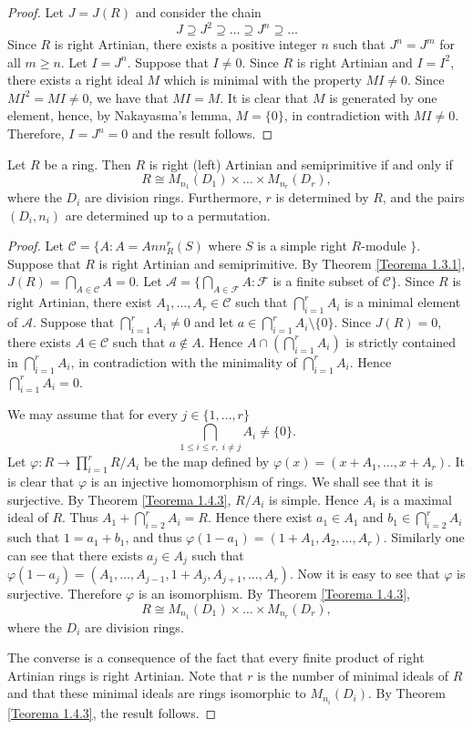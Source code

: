 \begin{proof}
Let $J=J(R)$ and consider the chain
$$J\supseteq J^2\supseteq\dots\supseteq J^n\supseteq\dots$$
Since $R$ is right Artinian, there exists a positive integer $n$
such that $J^n=J^m$ for all $m\geq n$. Let $I=J^n$. Suppose that
$I\neq 0$. Since $R$ is right Artinian and $I=I^2$, there exists a right ideal $M$ which is minimal with the property
$MI\neq 0$. Since $MI^2=MI\neq 0$,
we have that $MI=M$. It is clear that $M$ is generated by one element, hence, by Nakayasma's lemma, $M=\{0\}$, in contradiction with $MI\neq 0$. Therefore,
$I=J^n=0$ and the result follows.
\end{proof}

\begin{theorem}
Let $R$ be a ring. Then $R$ is right (left) Artinian and semiprimitive if and only if
$$R\cong M_{n_1}(D_1)\times \dots\times M_{n_r}(D_r),$$
where the $D_i$ are division rings. Furthermore, $r$ is determined by $R$, and the pairs $(D_i,n_i)$ are determined up to a permutation.
\end{theorem}

\begin{proof}
Let $\mathcal{C}=\{ A : A=Ann^r_R(S)$ where $S$ is a simple right $R$-module $\}$. Suppose that $R$ is right Artinian and semiprimitive.
By Theorem \ref{Teorema 1.3.1}, $J(R)=\bigcap_{A\in\mathcal{C}}A=0$. Let $\mathcal{A}=\{\bigcap_{A\in \mathcal{F}}A  : \mathcal{F}$ is a finite subset of $\mathcal{C}\}$. Since $R$ is right Artinian, there exist $A_1,\dots,A_r\in \mathcal{C}$ such that
$\bigcap_{i=1}^rA_i$ is a minimal element of $\mathcal{A}$. Suppose that
$\bigcap_{i=1}^rA_i\neq 0$ and let $a\in\bigcap_{i=1}^rA_i\setminus\{ 0\}$.
Since $J(R)=0$, there exists $A\in \mathcal{C}$ such that $a\notin A$. Hence $A\cap (\bigcap_{i=1}^rA_i)$ is strictly contained in $\bigcap_{i=1}^rA_i$, in contradiction with the minimality of $\bigcap_{i=1}^rA_i$. Hence $\bigcap_{i=1}^rA_i=0$.

We may assume that for every $j\in\{ 1,\dots ,r\}$  
$$\bigcap_{1\leq i\leq r,\;
i\neq j}A_i\neq \{0\}.$$
Let $\varphi\colon R\rightarrow \prod_{i=1}^rR/A_i$ be the map defined by
$\varphi(x)=(x+A_1,\dots,x+A_r)$. It is clear that $\varphi$ is an injective homomorphism of rings. We shall see that it is surjective. By Theorem \ref{Teorema 1.4.3},
$R/A_i$ is simple. Hence $A_i$ is a maximal ideal of $R$. Thus
$A_1+\bigcap_{i=2}^rA_i=R$. Hence there exist $a_1\in A_1$ and
$b_1\in\bigcap_{i=2}^rA_i$ such that $1=a_1+b_1$, and thus $\varphi
(1-a_1)=(1+A_1,A_2,\dots ,A_r)$. Similarly one can see that there exists $a_j\in A_j$ such that
$\varphi(1-a_j)=(A_1,\dots ,A_{j-1},1+A_j,A_{j+1},\dots, A_r)$. Now it is easy to see that $\varphi$ is surjective.
Therefore $\varphi$ is an isomorphism. By Theorem \ref{Teorema 1.4.3},
$$R\cong M_{n_1}(D_1)\times\dots\times M_{n_r}(D_r),$$
where the $D_i$ are division rings.

The converse is a consequence of the fact that every finite product of right Artinian rings is right Artinian. 
Note that  $r$ is the number of minimal ideals of $R$ and that these minimal ideals are rings isomorphic to $M_{n_i}(D_i)$.
By Theorem \ref{Teorema 1.4.3}, the result follows.
\end{proof}

